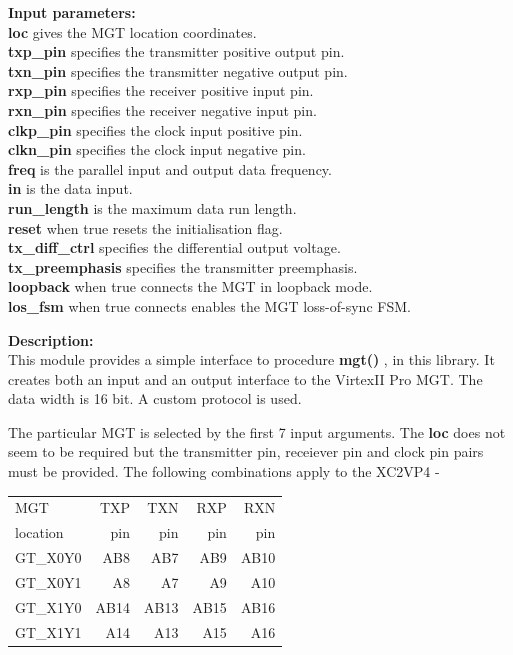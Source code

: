             {\bf Input parameters:} \\
            {\bf loc} gives the MGT location coordinates.\\
            {\bf txp\_pin} specifies the transmitter positive output pin.\\
            {\bf txn\_pin} specifies the transmitter negative output pin.\\
            {\bf rxp\_pin} specifies the receiver positive input pin.\\
            {\bf rxn\_pin} specifies the receiver negative input pin.\\
            {\bf clkp\_pin} specifies the clock input positive pin.\\
            {\bf clkn\_pin} specifies the clock input negative pin.\\
            {\bf freq} is the parallel input and output data frequency.\\
            {\bf in} is the data input.\\
            {\bf run\_length} is the maximum data run length.\\
            {\bf reset} when true resets the initialisation flag.\\
            {\bf tx\_diff\_ctrl} specifies the differential output voltage.\\
            {\bf tx\_preemphasis} specifies the transmitter preemphasis.\\
            {\bf loopback} when true connects the MGT in loopback mode.\\
            {\bf los\_fsm} when true connects enables the MGT loss-of-sync FSM.

            {\bf Description:} \\
            This module provides a simple interface to procedure
            {\bf mgt()} , in this library.
            It creates both an input and an output interface to the
            VirtexII Pro MGT. The data width is 16 bit. A custom protocol
            is used. 
            
            The particular MGT is selected by the first 7 input arguments.
            The {\bf loc} does not seem to be required but the transmitter pin,
            receiever pin and clock pin pairs must be provided. The following
            combinations apply to the XC2VP4 -           
            
            \begin{tabular}{| l || r | r | r | r |}
            \hline
            MGT      & TXP  & TXN  & RXP  & RXN  \\
            location & pin  & pin  & pin  & pin  \\
            \hline
            \hline
            GT\_X0Y0 & AB8  & AB7  & AB9  & AB10 \\
            \hline
            GT\_X0Y1 & A8   & A7   & A9   & A10  \\
            \hline
            GT\_X1Y0 & AB14 & AB13 & AB15 & AB16 \\
            \hline
            GT\_X1Y1 & A14  & A13  & A15  & A16  \\
            \hline
            \end{tabular}
            
